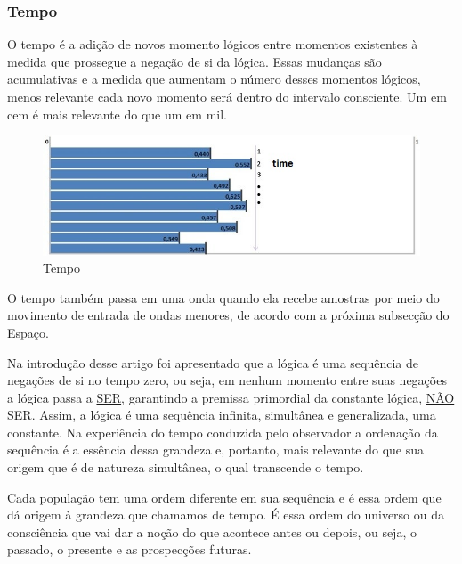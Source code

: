 \subsubsection{Tempo}
O tempo é a adição de novos momento lógicos entre momentos existentes à medida que prossegue a negação de si da lógica. Essas mudanças são acumulativas e a medida que aumentam o número desses momentos lógicos, menos relevante cada novo momento será dentro do intervalo consciente. Um em cem é mais relevante do que um em mil. 
	\begin{figure}[H]
	\caption{Tempo}
	\label{fig:consciousness_time}
	\centering
	\includegraphics[scale=.8]{sections/images/consciousness_time.jpg}
	\end{figure}

O tempo também passa em uma onda quando ela recebe amostras por meio do movimento de entrada de ondas menores, de acordo com a próxima subsecção do Espaço.

Na introdução desse artigo foi apresentado que a lógica é uma sequência de negações de si no tempo zero, ou seja, em nenhum momento entre suas negações a lógica passa a \underline{SER}, garantindo a premissa primordial da constante lógica, \underline{NÃO SER}. Assim, a lógica é uma sequência infinita, simultânea e generalizada, uma constante. Na experiência do tempo conduzida pelo observador a ordenação da sequência é a essência dessa grandeza e, portanto, mais relevante do que sua origem que é de natureza simultânea, o qual transcende o tempo.

Cada população tem uma ordem diferente em sua sequência e é essa ordem que dá origem à grandeza que chamamos de tempo. É essa ordem do universo ou da consciência que vai dar a noção do que acontece antes ou depois, ou seja, o passado, o presente e as prospecções futuras.

